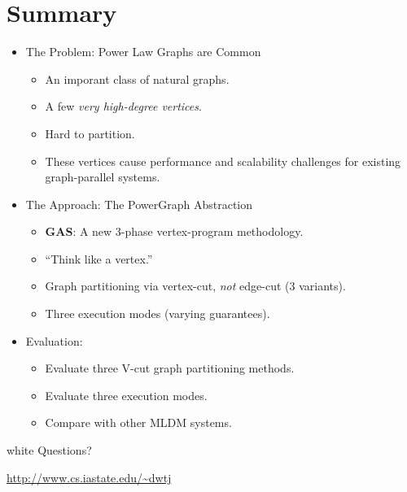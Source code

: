 \section*{Summary}

%
%


\begin{frame}
\begin{itemize}
  \frametitle{Overview}
  \item The Problem: Power Law Graphs are Common
  \begin{itemize}
    \item An imporant class of natural graphs.
    \item A few \textit{very high-degree vertices}.
    \item Hard to partition.
    \item These vertices cause performance and scalability challenges for
          existing graph-parallel systems.
  \end{itemize}
\end{itemize}
\end{frame}

\begin{frame}
\begin{itemize}
  \frametitle{Overview}
  \item The Approach: The PowerGraph Abstraction
  \begin{itemize}
    \item \textbf{GAS}: A new 3-phase vertex-program methodology.
    \item ``Think like a vertex.'' \citep[SIGMOD '10]{malewicz2010pregel}
    \item Graph partitioning via vertex-cut, \textit{not} edge-cut (3 variants).
    \item Three execution modes (varying guarantees).
  \end{itemize}

  \item Evaluation:
  \begin{itemize}
    \item Evaluate three V-cut graph partitioning methods.
    \item Evaluate three execution modes.
    \item Compare with other MLDM systems.
  \end{itemize}
\end{itemize}
\end{frame}

\begin{frame}
\begin{beamercolorbox}[center]{white}
  {\Large Questions?}

  \vspace{2em}\hfill

  \url{http://www.cs.iastate.edu/~dwtj}
\end{beamercolorbox}
\end{frame}
